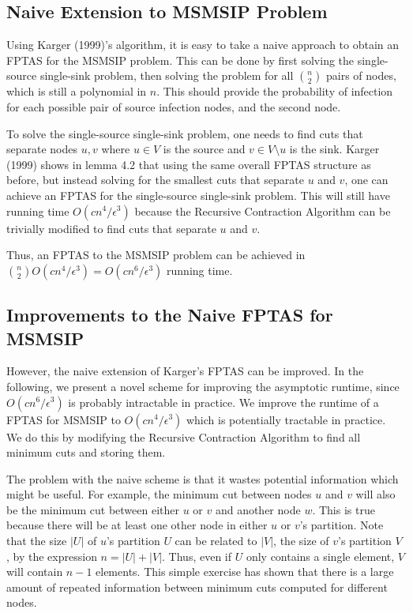 \documentclass{article}
\theoremstyle{plain}
\begin{document}
\subsection{Naive Extension to MSMSIP Problem}

Using Karger (1999)'s algorithm, it is easy to take a naive approach to obtain an FPTAS for the MSMSIP problem. This can be done by first solving the single-source single-sink problem, then solving the problem for all ${n \choose 2}$ pairs of nodes, which is still a polynomial in $n$. This should provide the probability of infection for each possible pair of source infection nodes, and the second node.

To solve the single-source single-sink problem, one needs to find cuts that separate nodes $u,v$ where $u \in V$ is the source and $v \in V \setminus u$ is the sink. Karger (1999) shows in lemma 4.2 that using the same overall FPTAS structure as before, but instead solving for the smallest cuts that separate $u$ and $v$, one can achieve an FPTAS for the single-source single-sink problem. This will still have running time $O(c n^4 / \epsilon^3)$ because the Recursive Contraction Algorithm can be trivially modified to find cuts that separate $u$ and $v$.

Thus, an FPTAS to the MSMSIP problem can be achieved in ${n \choose 2} O(c n^4 / \epsilon^3) = O(c n^6 /\epsilon^3)$ running time.

\subsection{Improvements to the Naive FPTAS for MSMSIP}

However, the naive extension of Karger's FPTAS can be improved. In the following, we present a novel scheme for improving the asymptotic runtime, since $O(c n^6 / \epsilon^3)$ is probably intractable in practice. We improve the runtime of a FPTAS for MSMSIP to $O(c n^4 / \epsilon^3)$ which is potentially tractable in practice. We do this by modifying the Recursive Contraction Algorithm to find all minimum cuts and storing them.

The problem with the naive scheme is that it wastes potential information which might be useful. For example, the minimum cut between nodes $u$ and $v$ will also be the minimum cut between either $u$ or $v$ and another node $w$. This is true because there will be at least one other node in either $u$ or $v$'s partition. Note that the size $|U|$ of $u$'s partition $U$ can be related to $|V|$, the size of $v$'s partition $V$, by the expression $n = |U| + |V|$. Thus, even if $U$ only contains a single element, $V$ will contain $n-1$ elements. This simple exercise has shown that there is a large amount of repeated information between minimum cuts computed for different nodes.
\end{document}
